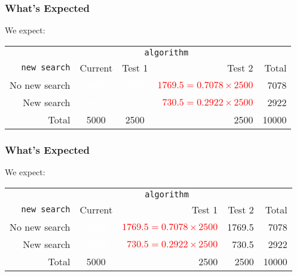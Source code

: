 \documentclass[handout]{beamer}
\newcommand{\white}[1]{\textcolor{white}{#1}}
\newcommand{\red}[1]{\textcolor{red}{#1}}
\begin{document}
\begin{frame}
\frametitle{What's Expected}

We expect:
\begin{center}
  \begin{tabular}{r|ccr|r}
& \multicolumn{3}{c|}{{\tt algorithm}} & \\
       {\tt new search} & Current & Test 1 & Test 2 & Total \\ 
\hline
    No new search & \white{4000} & \white{2000} & \red{$1769.5=0.7078 \times 2500$} & 7078 \\ 
    New search & \white{1000} & \white{500} & \red{$730.5=0.2922 \times 2500$} & 2922 \\ 
\hline
    Total & 5000 & 2500 & 2500 & 10000 \\ 
  \end{tabular}
\end{center}


\end{frame}


\begin{frame}
\frametitle{What's Expected}

We expect:
\begin{center}
  \begin{tabular}{r|crr|r}
& \multicolumn{3}{c|}{{\tt algorithm}} & \\
       {\tt new search} & Current & Test 1 & Test 2 & Total \\ 
\hline
    No new search & \white{4000} & \red{$1769.5=0.7078 \times 2500$} & 1769.5 & 7078 \\ 
    New search & \white{1000} & \red{$730.5=0.2922 \times 2500$} & 730.5 & 2922 \\ 
\hline
    Total & 5000 & 2500 & 2500 & 10000 \\ 
  \end{tabular}
\end{center}

\end{frame}
\end{document}
